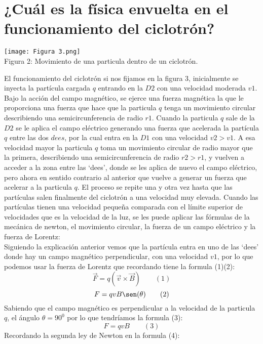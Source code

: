 \documentclass[12pt]{article}
\begin{document}
		\section{¿Cuál es la física envuelta en el funcionamiento del ciclotrón?}\label{sec:¿Cuál es la física envuelta en el funcionamiento del ciclotrón?}
			\begin{center}
				\texttt{[image: Figura 3.png]}\\
				Figura 2: Movimiento de una particula dentro de un ciclotrón. \cite{bib:item2}
			\end{center}
			El funcionamiento del ciclotrón si nos fijamos en la figura 3, inicialmente se inyecta la partícula 
			cargada $ q $ entrando en la $ D2 $ con una velocidad moderada $ v1 $. Bajo la acción del campo 
			magnético, se ejerce una fuerza magnética la que le proporciona una fuerza que hace que la particula $ q $
			tenga un movimiento circular describiendo una semicircunferencia de radio $ r1 $. Cuando la particula $ q $ 
			sale de la $ D2 $ se le aplica el campo eléctrico generando una fuerza que acelerada la partícula $ q $ 
			entre las dos $ dees $, por la cual entra en la $ D1 $ con una velocidad $ v2 > v1 $. A esa velocidad mayor 
			la particula $ q $ toma un movimiento circular de radio mayor que la primera, describiendo una semicircunferencia 
			de radio $ r2 > r1 $, y vuelven a acceder a la zona entre las ‘dees’, donde se les aplica de nuevo el 
			campo eléctrico, pero ahora en sentido contrario al anterior que vuelve a generar un fuerza que acelerar a 
			la particula $ q $. El proceso se repite una y otra vez hasta que las partículas salen finalmente del ciclotrón 
			a una velocidad muy elevada. Cuando las partículas tienen una velocidad pequeña comparada con el límite superior 
			de velocidades que es la velocidad de la luz, se les puede aplicar las fórmulas de la mecánica de newton, 
			el movimiento circular, la fuerza de un campo eléctrico y la fuerza de Lorentz:\\
			Siguiendo la explicación anterior vemos que la partícula entra en uno de las ‘dees’ donde hay un campo magnético 
			perpendicular, con una velocidad $ v1 $, por lo que podemos usar la fuerza de Lorentz que recordando tiene la 
			formula (1)(2):
			$$ \vec{F} = q(\vec{v} \times \vec{B}) \qquad (1) $$
			$$ F = qvB\sen(\theta) \qquad (2) $$
			Sabiendo que el campo magnético es perpendicular a la velocidad de la particula $ q $, el ángulo $ \theta = 90^0 $ 
			por lo que tendríamos la formula (3):
			$$ F = qvB \qquad (3) $$
			Recordando la segunda ley de Newton en la formula (4):
\end{document}
